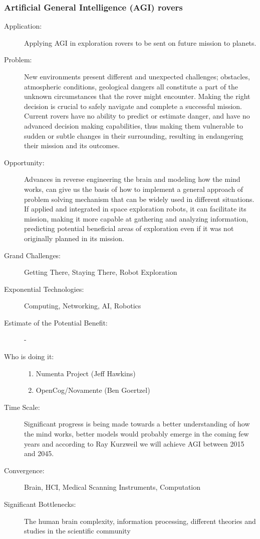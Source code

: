 \subsubsection{Artificial General Intelligence (AGI) rovers}
\begin{description}  \item[Application:] Applying \gls{AGI} in exploration rovers to be sent on  future mission to planets.
\item[Problem:] New environments  present different and unexpected challenges; obstacles, atmospheric  conditions, geological dangers all constitute a part of the unknown  circumstances that the rover might encounter. Making the right decision  is crucial to safely navigate and complete a successful mission. Current  rovers have no ability to predict or estimate danger, and have no  advanced decision making capabilities, thus making them vulnerable to  sudden or subtle changes in their surrounding, resulting in endangering  their mission and its outcomes.
\item[Opportunity:]  Advances in reverse engineering the brain and modeling how the mind  works, can give us the basis of how to implement a general approach of  problem solving mechanism that can be widely used in different  situations. If applied and integrated in space exploration robots, it  can facilitate its mission, making it more capable at gathering and  analyzing information, predicting potential beneficial areas of  exploration even if it was not originally planned in its mission.
\item[Grand Challenges:] Getting  There, Staying There, Robot Exploration
\item[Exponential Technologies:] Computing, Networking, AI,  Robotics
\item[Estimate of the Potential  Benefit:] - 
\item[Who is doing it:]
\hfill\begin{enumerate}
\item Numenta Project (Jeff Hawkins)
\item  OpenCog/Novamente (Ben  Goertzel)
\end{enumerate}
\item[Time Scale:] Significant  progress is being made towards a better understanding of how the mind  works, better models would probably emerge in the coming few years and  according to Ray Kurzweil we will achieve \gls{AGI} between 2015 and 2045.
\item[Convergence:] Brain, HCI,  Medical Scanning Instruments, Computation
\item[Significant  Bottlenecks:] The human brain complexity, information processing,  different theories and studies in the scientific community
\end{description}

